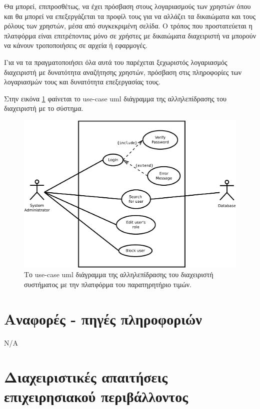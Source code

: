 \documentclass[12pt, oneside, a4paper]{report}
\begin{document}
\hspace{0.6cm}Θα μπορεί, επιπροσθέτως, να έχει πρόσβαση στους λογαριασμούς των χρηστών όπου και θα μπορεί να επεξεργάζεται τα προφίλ τους για να αλλάζει τα δικαιώματα και τους ρόλους των χρηστών, μέσα από συγκεκριμένη σελίδα. Ο τρόπος που προστατεύεται η πλατφόρμα είναι επιτρέποντας μόνο σε χρήστες με δικαιώματα διαχειριστή να μπορούν να κάνουν τροποποιήσεις σε αρχεία ή εφαρμογές.

\hspace{0.6cm}Για να τα πραγματοποιήσει όλα αυτά του παρέχεται ξεχωριστός λογαριασμός διαχειριστή με δυνατότητα αναζήτησης χρηστών, πρόσβαση στις πληροφορίες των λογαριασμών τους και δυνατότητα επεξεργασίας τους.

\hspace{0.6cm}Στην εικόνα \ref{uml2} φαίνεται το use-case uml διάγραμμα της αλληλεπίδρασης του διαχειριστή με το σύστημα.

\begin{figure}[H]
   \centering
   \includegraphics[scale=0.4,keepaspectratio=true]{./admin_use_case.pdf}
   \caption{Το use-case uml διάγραμμα της αλληλεπίδρασης του διαχειριστή συστήματος με την πλατφόρμα του παρατηρητήριο τιμών.}
    \label{uml2}
\end{figure}

\section{Αναφορές - πηγές πληροφοριών}
N/A

\section{Διαχειριστικές απαιτήσεις επιχειρησιακού περιβάλλοντος}
\end{document}
